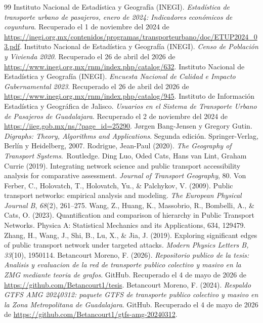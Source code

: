 \begin{thebibliography}{99}
     Instituto Nacional de Estadística y Geografía (INEGI).  \textit{Estadística de transporte urbano de pasajeros, enero de 2024: Indicadores económicos de coyuntura}. Recuperado el 1 de noviembre del 2024 de \url{https://inegi.org.mx/contenidos/programas/transporteurbano/doc/ETUP2024_03.pdf}.
     Instituto Nacional de Estadística y Geografía (INEGI). \textit{Censo de Población y Vivienda 2020}. Recuperado el 26 de abril del 2026 de \url{https://www.inegi.org.mx/rnm/index.php/catalog/632}.
     Instituto Nacional de Estadística y Geografía (INEGI). \textit{Encuesta Nacional de Calidad e Impacto Gubernamental 2023}. Recuperado el 26 de abril del 2026 de \url{https://www.inegi.org.mx/rnm/index.php/catalog/945}.
     Instituto de Información Estadística y Geográfica de Jalisco. \textit{Usuarios en el Sistema de Transporte Urbano de Pasajeros de Guadalajara}. Recuperado el 2 de noviembre del 2024 de \url{https://iieg.gob.mx/ns/?page_id=25290}.
     Jørgen Bang-Jensen y Gregory Gutin. \textit{Digraphs: Theory, Algorithms and Applications}. Segunda edición. Springer-Verlag, Berlín y Heidelberg, 2007.
     Rodrigue, Jean-Paul (2020). \textit{The Geography of Transport Systems}.\ Routledge.
     Ding Luo, Oded Cats, Hans van Lint, Graham Currie (2019). Integrating network science and public transport accessibility analysis for comparative assessment. \textit{Journal of Transport Geography}, 80.
     Von Ferber, C., Holovatch, T., Holovatch, Yu., \& Palchykov, V. (2009). Public transport networks: empirical analysis and modeling. \textit{The European Physical Journal B}, \textit{68}(2), 261–275.
     Wang, Z., Huang, K., Massobrio, R., Bombelli, A., \& Cats, O. (2023). Quantification and comparison of hierarchy in Public Transport Networks. Physica A: Statistical Mechanics and its Applications, 634, 129479.
     Zhang, H., Wang, J., Shi, B., Lu, X., \& Jia, J. (2019). Exploring significant edges of public transport network under targeted attacks. \textit{Modern Physics Letters B, 33}(10), 1950114.
     Betancourt Moreno, F. (2026). \textit{Repositorio publico de la tesis: Analisis y evaluacion de la red de transporte publico colectivo y masivo en la ZMG mediante teoria de grafos}. GitHub. Recuperado el 4 de mayo de 2026 de \url{https://github.com/Betancourt1/tesis}.
     Betancourt Moreno, F. (2024). \textit{Respaldo GTFS AMG 20240312: paquete GTFS de transporte publico colectivo y masivo en la Zona Metropolitana de Guadalajara}. GitHub. Recuperado el 4 de mayo de 2026 de \url{https://github.com/Betancourt1/gtfs-amg-20240312}.


\end{thebibliography}

